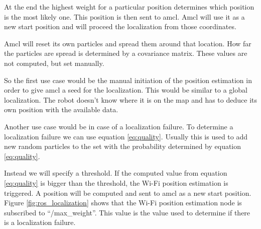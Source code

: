 At the end the highest weight for a particular position determines which position is the most likely one. This position is then sent to amcl. Amcl will use it as a new start position and will proceed the localization from those coordinates. 

Amcl will reset its own particles and spread them around that location. How far the particles are spread is determined by a covariance matrix. These values are not computed, but set manually.

So the first use case would be the manual initiation of the position estimation in order to give amcl a seed for the localization. This would be similar to a global localization. The robot doesn't know where it is on the map and has to deduce its own position with the available data. 

Another use case would be in case of a localization failure. To determine a localization failure we can use equation \ref{eq:quality}. Usually this is used to add new random particles to the set with the probability determined by equation \ref{eq:quality}. 

Instead we will specify a threshold. If the computed value from equation \ref{eq:quality} is bigger than the threshold, the Wi-Fi position estimation is triggered. A position will be computed and sent to amcl as a new start position. Figure \ref{fig:ros_localization} shows that the Wi-Fi position estimation node is subscribed to ``/max\_weight''. This value is the value used to determine if there is a localization failure. 